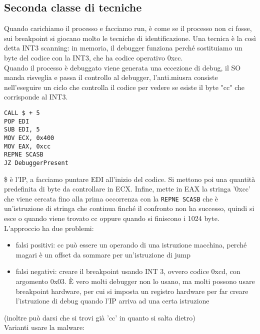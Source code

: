 \documentclass[12pt, oneside]{extbook}
\begin{document}
\subsection{Seconda classe di tecniche}
Quando carichiamo il processo e facciamo run, è come se il processo non ci fosse, sui breakpoint si giocano molto le tecniche di identificazione. Una tecnica è la così detta INT3 scanning: in memoria, il debugger funziona perché sostituiamo un byte del codice con la INT3, che ha codice operativo 0xcc.\\Quando il processo è debuggato viene generata una eccezione di debug, il SO manda risveglia e passa il controllo al debugger, l'anti.miusra consiste nell'eseguire un ciclo che controlla il codice per vedere se esiste il byte "cc" che corrisponde al INT3.
\begin{lstlisting}
CALL $ + 5
POP EDI
SUB EDI, 5
MOV ECX, 0x400
MOV EAX, 0xcc
REPNE SCASB
JZ DebuggerPresent
\end{lstlisting}
\$ è l'IP, a facciamo puntare EDI all'inizio del codice. Si mettono poi una quantità predefinita di byte da controllare in ECX. Infine, mette in EAX la stringa '0xcc' che viene cercata fino alla prima occorrenza con la \texttt{REPNE SCASB} che è un'istruzione di stringa che continua finché il confronto non ha successo, quindi si esce o quando viene trovato cc oppure quando si finiscono i 1024 byte.\\L'approccio ha due problemi:
\begin{itemize}
\item falsi positivi: cc può essere un operando di una istruzione macchina, perché magari è un offset da sommare per un'istruzione di jump
\item falsi negativi: creare il breakpoint usando INT 3, ovvero codice 0xcd, con argomento 0x03. È vero molti debugger non lo usano, ma molti possono usare breakpoint hardware, per cui si imposta un registro hardware per far creare l'istruzione di debug quando l'IP arriva ad una certa istruzione
\end{itemize}
(inoltre può darsi che si trovi già 'cc' in quanto si salta dietro)\\Varianti usare la malware:
\end{document}
